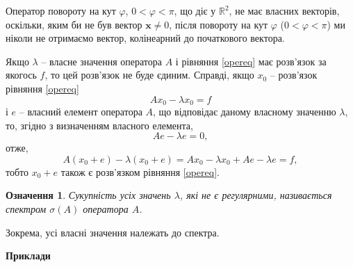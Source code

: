 \documentclass[14pt,twoside]{extreport}
\theoremstyle{mystyle}
\newtheorem{dfn}{Означення}
\numberwithin{equation}{chapter}
\begin{document}
Оператор повороту на кут $\varphi$, $0 < \varphi < \pi$, що діє у $\mathbb{R}^2$, не має власних векторів, оскільки, яким би не був вектор $\mathbf{x} \neq 0$, після повороту на кут $\varphi$ ($0 < \varphi < \pi$) ми ніколи не отримаємо вектор, колінеарний до початкового вектора.

Якщо $\lambda$ -- власне значення оператора $A$ і рівняння \eqref{opereq} має розв'язок за якогось $f$, то цей розв'язок не буде єдиним. Справді, якщо $x_0$ -- розв'язок рівняння \eqref{opereq}
\[
Ax_0 - \lambda x_0 = f
\]
і $e$ -- власний елемент оператора $A$, що відповідає даному власному значенню $\lambda$, то, згідно з визначенням власного елемента,
\[
Ae - \lambda e = 0,
\]
отже,
\[
A(x_0 + e) - \lambda (x_0 + e) = Ax_0 - \lambda x_0 + Ae - \lambda e = f,
\]
тобто $x_0 + e$ також є розв'язком рівняння \eqref{opereq}.

\begin{dfn}
	Сукупність усіх значень $\lambda$, які не є регулярними, називається спектром $\sigma(A)$ оператора $A$.
\end{dfn}
Зокрема, усі власні значення належать до спектра.

\textbf{Приклади}
\end{document}
